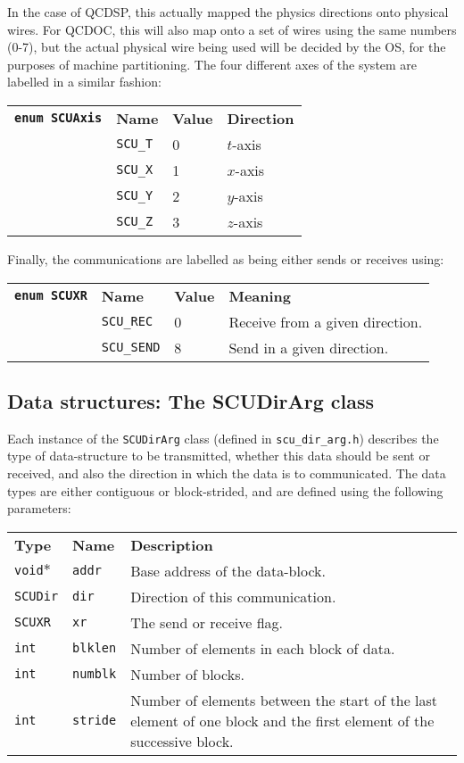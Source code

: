 \documentclass[12pt]{article}
\newcommand{\cde}[1]{{\tt #1}}            %
\begin{document}
In the case of QCDSP, this actually mapped the physics directions
onto physical wires.  For QCDOC, this will also map onto a set of
wires using the same numbers (0-7), but the actual physical wire being
used will be decided by the OS, for the purposes of machine
partitioning. The four different axes of the system are labelled in a
similar fashion:

\begin{tabular}{llll}
\cde{{\bf enum SCUAxis}} & {\bf Name} & {\bf Value} & {\bf Direction} \\
			&\cde{SCU\_\-T} & 0 & $t$-axis\\
			&\cde{SCU\_\-X} & 1 & $x$-axis\\
			&\cde{SCU\_\-Y} & 2 & $y$-axis\\
			&\cde{SCU\_\-Z} & 3 & $z$-axis
\end{tabular}

Finally, the communications are labelled as being either sends or receives using:

\begin{tabular}{llll}
\cde{{\bf enum SCUXR}} & {\bf Name} & {\bf Value} & {\bf Meaning} \\
			&\cde{SCU\_\-REC}  & 0 & Receive from a given direction. \\
			&\cde{SCU\_\-SEND} & 8 & Send in a given direction.
\end{tabular}

\subsection{Data structures: The SCUDirArg class}
\label{col:comm:data}
Each instance of the \cde{SCUDirArg} class (defined in
\cde{scu\_dir\_arg.h}) describes the type of data-structure to be
transmitted, whether this data should be sent or received, and also
the direction in which the data is to communicated.  The data types
are either contiguous or block-strided, and are defined using the
following parameters:

\begin{tabularx}{16cm}{llX}
{\bf Type}  & {\bf Name} & {\bf Description} \\
\cde{void$\ast$}  & \cde{addr}       & Base address of the data-block. \\
\cde{SCUDir}      & \cde{dir}        & Direction of this communication. \\
\cde{SCUXR}       & \cde{xr}         & The send or receive flag.\\
\cde{int}         & \cde{blklen}     & Number of elements in each block of data. \\
\cde{int}         & \cde{numblk}     & Number of blocks.\\
\cde{int}         & \cde{stride}     & Number of elements between the
start of the last element of one block and the first element of the successive block.
\end{tabularx}
\end{document}
